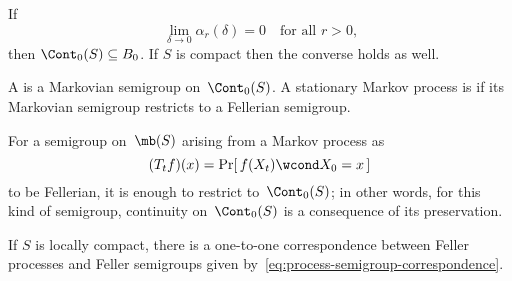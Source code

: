 \begin	{theorem}
If
\[ \lim_{\delta\to0} \alpha_r(\delta) = 0 \quad \text{for all \(r>0\),} \]
then \( \Cont_0(S) \subseteq B_0 \).
If $S$ is compact then the converse holds as well.
\end	{theorem}

\begin	{definition}
A  is a Markovian semigroup on~$\Cont_0(S)$.
A stationary Markov process is 
if its Markovian semigroup restricts to a Fellerian semigroup.
\end	{definition}

\begin	{theorem}
For a semigroup on~$\mb(S)$ arising from a Markov process
as
\begin	{equation}
\label	{eq:process-semigroup-correspondence}
	(T_tf)(x) = \Pr[\, f(X_t) \wcond X_0 = x \,]
\end	{equation}
to be Fellerian,
it is enough to restrict to~$\Cont_0(S)$;
in other words, for this kind of semigroup,
continuity on~$\Cont_0(S)$ is a consequence of its preservation.
\end	{theorem}

\begin	{theorem}
If $S$ is locally compact,
there is a one-to-one correspondence
between Feller processes and Feller semigroups
given by~\eqref{eq:process-semigroup-correspondence}.
\end	{theorem}
